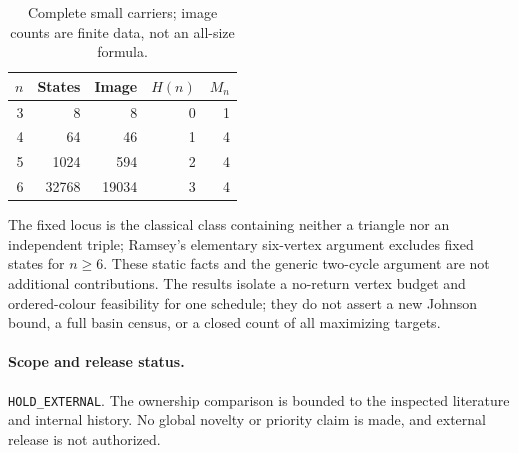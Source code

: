 \documentclass[a4paper,10pt]{amsart}
\theoremstyle{remark}
\begin{document}
\begin{table}[h]
\centering
\caption{Complete small carriers; image counts are finite data, not an all-size formula.}
\label{tab:checks}
\begin{tabular}{rrrrr}
\toprule
$n$ & States & Image & $H(n)$ & $M_n$\\
\midrule
3&8&8&0&1\\
4&64&46&1&4\\
5&1024&594&2&4\\
6&32768&19034&3&4\\
\bottomrule
\end{tabular}
\end{table}

The fixed locus is the classical class containing neither a triangle nor
an independent triple; Ramsey's elementary six-vertex argument excludes
fixed states for $n\ge6$. These static facts and the generic two-cycle
argument are not additional contributions. The results isolate a
no-return vertex budget and ordered-colour feasibility for one schedule;
they do not assert a new Johnson bound, a full basin census, or a closed
count of all maximizing targets.

\paragraph{Scope and release status.}
\texttt{HOLD\_EXTERNAL}. The ownership comparison is bounded to the
inspected literature and internal history. No global novelty or priority
claim is made, and external release is not authorized.



\end{document}
